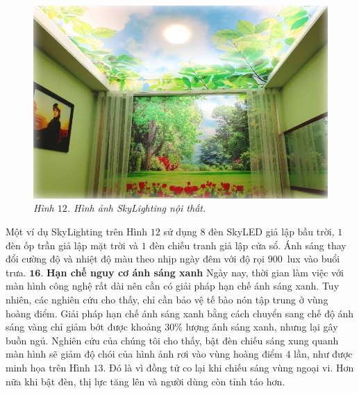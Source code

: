 \begin{multicols}{2}
	\begin{figure}[H]
		\vspace*{-5pt}
		\centering
		\captionsetup{labelformat= empty, justification=centering}
		\includegraphics[width= 1\linewidth]{12}
		\caption{\small\textit{\color{timhieukhoahoc}Hình $12$. Hình ảnh SkyLighting nội thất.}}
		\vspace*{-10pt}
	\end{figure}
	Một ví dụ SkyLighting trên Hình $12$ sử dụng $8$ đèn SkyLED giả lập bầu trời, $1$ đèn ốp trần giả lập mặt trời và $1$ đèn chiếu tranh giả lập cửa sổ. Ánh sáng thay đổi cường độ và nhiệt độ màu theo nhịp ngày đêm với độ rọi $900$~lux vào buổi trưa. 
	\vskip 0.1cm
	$\pmb{16.}$ \textbf{\color{timhieukhoahoc}Hạn chế nguy cơ ánh sáng xanh}
	\vskip 0.1cm
	\vskip 0.1cm
	Ngày nay, thời gian làm việc với màn hình công nghệ rất dài nên cần có giải pháp hạn chế ánh sáng xanh. Tuy nhiên, các nghiên cứu cho thấy, chỉ cần bảo vệ tế bào nón tập trung ở vùng hoàng điểm. 
	\vskip 0.1cm
	Giải pháp hạn chế ánh sáng xanh bằng cách chuyển sang chế độ ánh sáng vàng chỉ giảm bớt được khoảng $30\%$ lượng ánh sáng xanh, nhưng lại gây buồn ngủ. 
	\vskip 0.1cm
	Nghiên cứu của chúng tôi cho thấy, bật đèn chiếu sáng xung quanh màn hình sẽ giảm độ chói của hình ảnh rơi vào vùng hoàng điểm $4$ lần, như được minh họa trên Hình $13$. Đó là vì đồng tử co lại khi chiếu sáng vùng ngoại vi. Hơn nữa khi bật đèn, thị lực tăng lên và người dùng còn tỉnh táo hơn.
	\begin{figure}[H]
		\vspace*{-5pt}
		\centering
		\captionsetup{labelformat= empty, justification=centering}

\end{figure}
\end{multicols}
